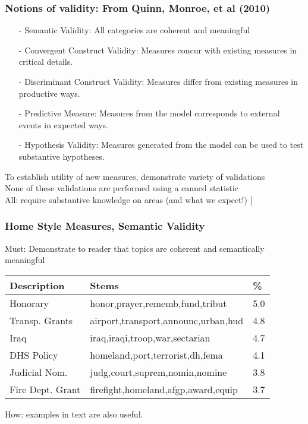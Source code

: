 \documentclass{beamer}
\numberwithin{equation}{section}
\begin{document}
\begin{frame}
\frametitle{Notions of validity: From Quinn, Monroe, et al (2010) } 

\begin{enumerate}
\item[-] \alert{Semantic Validity:} All categories are coherent and meaningful
\item[-] \alert{Convergent Construct Validity:} Measures concur with existing measures in critical details.
\item[-]  \alert{Discriminant Construct Validity}: Measures differ from existing measures in productive ways.  
\item[-] \alert{Predictive Measure:} Measures from the model corresponds to external events in expected ways.
\item[-] \alert{Hypothesis Validity:} Measures generated from the model can be used to test substantive hypotheses. 
\end{enumerate}

To establish utility of new measures, demonstrate variety of \alert{validations}\\
\alert{None of these validations are performed using a canned statistic}\\
\alert{All}: require substantive knowledge on areas (and what we expect!) [

\end{frame}


\begin{frame}
\frametitle{Home Style Measures, Semantic Validity} 


\alert{Must}: Demonstrate to reader that topics are coherent and semantically meaningful

\begin{tabular}{lll}
\hline\hline
Description & Stems & \% \\
\hline
Honorary& honor,prayer,rememb,fund,tribut& 5.0\\
Transp. Grants& airport,transport,announc,urban,hud&4.8\\
Iraq& iraq,iraqi,troop,war,sectarian& 4.7\\
DHS Policy& homeland,port,terrorist,dh,fema&4.1\\
Judicial Nom.& judg,court,suprem,nomin,nomine&3.8\\
Fire Dept. Grant& firefight,homeland,afgp,award,equip&3.7\\
\hline
\end{tabular}

How: \alert{examples} in text are also useful.  


\end{frame}
\end{document}

